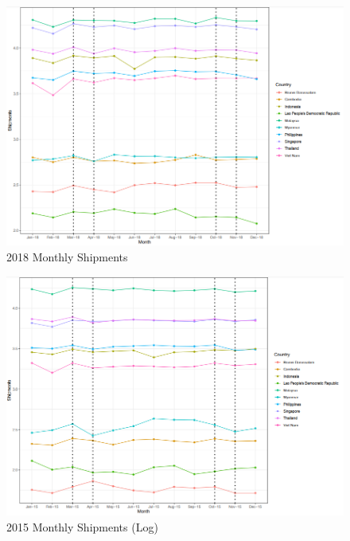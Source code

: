 \documentclass{article}
\begin{document}
\begin{figure}[H]
\centering
\includegraphics[width=1\textwidth]{images/Line Plots/Seasonal/2018_seasonal.png}
\caption{2018 Monthly Shipments}
\end{figure}

\begin{figure}[H]
\centering
\includegraphics[width=1\textwidth]{images/Line Plots/Seasonal/2015_seasonal_log.png}
\caption{2015 Monthly Shipments (Log)}
\end{figure}
\end{document}
